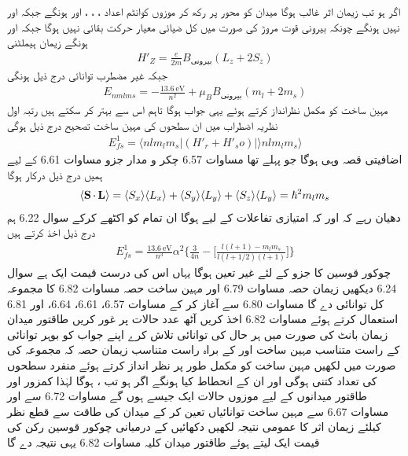 اگر  ہو تب زیمان  اثر غالب ہوگا میدان  کو  محور پر رکھ کر موزوں کوانٹم اعداد ، ، ، اور  ہونگے جبکہ  اور  نہیں ہونگے چونکہ بیرونی قوت مروڑ کی صورت میں کل ضیائی معیار حرکت بقائی  نہیں ہوگا جبکہ  اور  ہونگے زیمان ہیملٹنی 
\begin{align*}
H'_Z = \frac{e}{2m} B_{\text{بیرونی}} (L_z + 2S_z)
\end{align*}
جبکہ غیر مضطرب توانائی درج ذیل ہونگی 
\begin{align}
E_{nmlms} = - \frac{\SI{13.6}{\electronvolt}}{n^2} + \mu_B B_{\text{بیرونی}} (m_l + 2m_s)
\end{align}
مہین ساخت کو مکمل نظرانداز کرتے ہوئے یہی جواب ہوگا تاہم اس سے بہتر کر سکتے ہیں رتبہ اول نظریہ اضطراب میں ان سطحوں کی مہین ساخت تصحیح درج ذیل ہوگی 
\begin{align}
E_{fs}^1 = \langle nlm_l m_s | (H'_r + H'_so) | \rangle nlm_l m_s \rangle
\end{align}
اضافیتی قصہ وہی ہوگا جو پہلے تھا مساوات 6.57 چکر و مدار جزو مساوات 6.61 کے لیے ہمیں درج ذیل درکار ہوگا 
\begin{align}
\langle \operatorname{\mathbf{S}} \cdot \operatorname{\mathbf{L}} \rangle = \langle S_x \rangle \langle L_x \rangle + \langle S_y \rangle \langle L_y \rangle + \langle S_z \rangle \langle L_y \rangle = \hslash^2 m_l m_s
\end{align}
دھیان رہے کہ  اور  کہ امتیازی تفاعلات کے لیے  ہوگا ان تمام کو اکٹھے کرکے سوال 6.22 ہم درج ذیل اخذ کرتے ہیں 
\begin{align}
E_{fs}^1 = \frac{\SI{13.6}{\electronvolt}}{n^3} \alpha^2 \big \{ \frac{3}{4n} - \big [ \frac{l(l + 1) - m_l m_s}{l(l + 1/2)(l + 1)} \big ] \}
\end{align}
 چوکور  قوسین   کا جزو  کے لئے غیر تعین ہوگا یہاں اس کی درست قیمت ایک ہے سوال 6.24 دیکھیں زیمان حصہ مساوات 6.79 اور مہین ساخت حصہ مساوات 6.82 کا مجموعہ کل توانائی دے گا 
مساوات 6.80 سے آغاز کر کے مساوات 6.57، 6.61، 6.64، اور 6.81 استعمال کرتے ہوئے مساوات 6.82 اخذ کریں 
آٹھ عدد  حالات   پر غور کریں طاقتور میدان زیمان بانٹ کی صورت میں ہر حال کی توانائی تلاش کرے اپنے جواب کو بوہر توانائی   کے راست متناسب مہین ساخت اور   کے براہ راست متناسب زیمان حصہ کہ مجموعہ کی صورت میں لکھیں مہین  ساخت کو مکمل طور پر نظر انداز کرتے ہوئے منفرد سطحوں کی تعداد کتنی ہوگی اور ان کے انحطاط کیا ہونگے 
اگر  ہو تب ،  ہوگا لہٰذا کمزور اور طاقتور میدانوں کے لیے موزوں حالات  ایک  جیسے ہوں گے مساوات 6.72 سے  اور مساوات 6.67 سے مہین ساخت توانائیاں تعین کر کے میدان کی طاقت سے قطع نظر  کیلئے زیمان اثر کا عمومی نتیجہ لکھیں دکھائیں کے درمیانی چوکور قوسین   رکن کی قیمت ایک لیتے ہوئے طاقتور میدان کلیہ مساوات 6.82 یہی نتیجہ دے گا 

